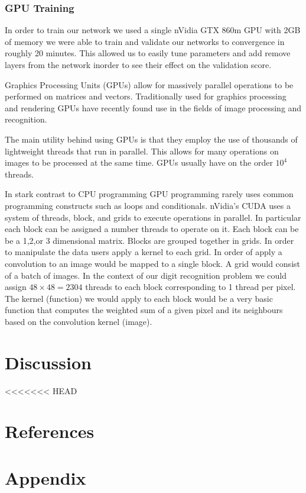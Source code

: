 \documentclass[10pt,twocolumn]{article}
\begin{document}
\subsubsection{GPU Training}
In order to train our network we used a single nVidia GTX 860m GPU with 2GB of memory we were able to train and validate our networks to convergence in roughly 20 minutes. This allowed us to easily tune parameters and add remove layers from the network inorder to see their effect on the validation score.

Graphics Processing Units (GPUs) allow for massively parallel operations to be performed on matrices and vectors. Traditionally used for graphics processing and rendering GPUs have recently found use in the fields of image processing and recognition. 

The main utility behind using GPUs is that they employ the use of thousands of lightweight threads that run in parallel. This allows for many operations on images to be processed at the same time. GPUs usually have on the order $10^4$ threads.

In stark contrast to CPU programming GPU programming rarely uses common programming constructs such as loops and conditionals. nVidia\textsuperscript{\textregistered}'s CUDA uses a system of threads, block, and grids to execute operations in parallel. In particular each block can be assigned a number threads to operate on it. Each block can be be a 1,2,or 3 dimensional matrix. Blocks are grouped together in grids. In order to manipulate the data  users apply a kernel to each grid. In order of apply a convolution to an image would be mapped to a single block. A grid would consist of a batch of images. In the context of our digit recognition problem we could assign $48 \times 48 = 2304$ threads to each block corresponding to 1 thread per pixel. The kernel (function) we would apply to each block would be a very basic function that computes the weighted sum of a given pixel and its neighbours based on the convolution kernel (image).
\section{Discussion}
<<<<<<< HEAD
\section{References}


\section{Appendix}
\end{document}
